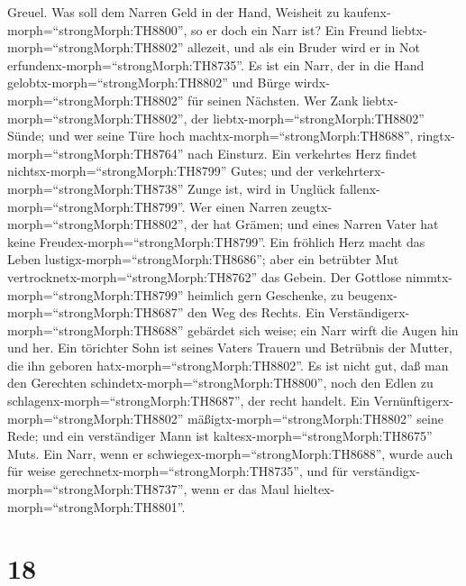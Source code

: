 Greuel.  Was soll dem Narren Geld in der Hand, Weisheit zu
kaufenx-morph=``strongMorph:TH8800'', so er doch ein Narr ist?
 Ein Freund liebtx-morph=``strongMorph:TH8802'' allezeit,
und als ein Bruder wird er in Not
erfundenx-morph=``strongMorph:TH8735''.  Es ist ein Narr,
der in die Hand gelobtx-morph=``strongMorph:TH8802'' und Bürge
wirdx-morph=``strongMorph:TH8802'' für seinen Nächsten. 
Wer Zank liebtx-morph=``strongMorph:TH8802'', der
liebtx-morph=``strongMorph:TH8802'' Sünde; und wer seine Türe hoch
machtx-morph=``strongMorph:TH8688'', ringtx-morph=``strongMorph:TH8764''
nach Einsturz.  Ein verkehrtes Herz findet
nichtsx-morph=``strongMorph:TH8799'' Gutes; und der
verkehrterx-morph=``strongMorph:TH8738'' Zunge ist, wird in Unglück
fallenx-morph=``strongMorph:TH8799''.  Wer einen Narren
zeugtx-morph=``strongMorph:TH8802'', der hat Grämen; und eines Narren
Vater hat keine Freudex-morph=``strongMorph:TH8799''.  Ein
fröhlich Herz macht das Leben lustigx-morph=``strongMorph:TH8686''; aber
ein betrübter Mut vertrocknetx-morph=``strongMorph:TH8762'' das Gebein.
 Der Gottlose nimmtx-morph=``strongMorph:TH8799'' heimlich
gern Geschenke, zu beugenx-morph=``strongMorph:TH8687'' den Weg des
Rechts.  Ein Verständigerx-morph=``strongMorph:TH8688''
gebärdet sich weise; ein Narr wirft die Augen hin und her. 
Ein törichter Sohn ist seines Vaters Trauern und Betrübnis der Mutter,
die ihn geboren hatx-morph=``strongMorph:TH8802''.  Es ist
nicht gut, daß man den Gerechten schindetx-morph=``strongMorph:TH8800'',
noch den Edlen zu schlagenx-morph=``strongMorph:TH8687'', der recht
handelt.  Ein Vernünftigerx-morph=``strongMorph:TH8802''
mäßigtx-morph=``strongMorph:TH8802'' seine Rede; und ein verständiger
Mann ist kaltesx-morph=``strongMorph:TH8675'' Muts.  Ein
Narr, wenn er schwiegex-morph=``strongMorph:TH8688'', wurde auch für
weise gerechnetx-morph=``strongMorph:TH8735'', und für
verständigx-morph=``strongMorph:TH8737'', wenn er das Maul
hieltex-morph=``strongMorph:TH8801''.

\hypertarget{section-17}{%
\section{18}\label{section-17}}

